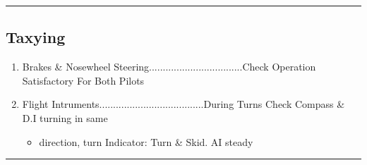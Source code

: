\documentclass[a4paper]{article}
\newenvironment{checklist}{
  \begin{itemize}[leftmargin=*, align=left]
    \setlength{\itemsep}{2pt}
    \setlength{\parskip}{0pt}
    \setlength{\parsep}{0pt}
}{
  \end{itemize}
}
\newenvironment{numberedchecklist}{
  \begin{enumerate}[label=\arabic*., leftmargin=*, align=left]
    \setlength{\itemsep}{2pt}
    \setlength{\parskip}{0pt}
    \setlength{\parsep}{0pt}
}{
  \end{enumerate}
}
\begin{document}
\rule{\linewidth}{0.4pt}

\subsection*{Taxying}
\begin{numberedchecklist}
\item Brakes \& Nosewheel Steering..................................Check Operation Satisfactory For Both Pilots
\item Flight Intruments......................................During Turns Check Compass \& D.I turning in same
  \begin{checklist}
  \item direction, turn Indicator: Turn \& Skid. AI steady
  \end{checklist}
\end{numberedchecklist}

\rule{\linewidth}{0.4pt}
\end{document}
